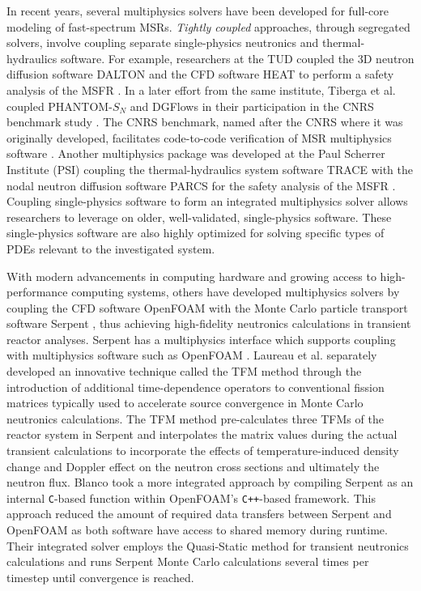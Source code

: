 In recent years, several multiphysics solvers have been developed for full-core
modeling of fast-spectrum \glspl{MSR}. \textit{Tightly coupled} approaches,
through segregated solvers, involve coupling separate single-physics neutronics
and thermal-hydraulics software. For example, researchers at
the \gls{TUD} coupled the 3D neutron diffusion software DALTON
\cite{boer_validation_2010} and the \gls{CFD} software HEAT
\cite{de_zwaan_static_2007} to perform a safety analysis of the \gls{MSFR}
\cite{fiorina_modelling_2014}. In a later effort from the same institute,
Tiberga et al. \cite{tiberga_discontinuous_2019} coupled PHANTOM-$S_N$ and
DGFlows in their participation in the CNRS benchmark study
\cite{tiberga_results_2020}. The CNRS benchmark, named after the \gls{CNRS}
where it was originally developed, facilitates code-to-code verification of
\gls{MSR} multiphysics software \cite{aufiero_testing_2018}. Another
multiphysics package was developed at the Paul Scherrer Institute (PSI)
coupling the thermal-hydraulics system software \gls{TRACE}
\cite{nrc_trace_2007} with the
nodal neutron diffusion software \gls{PARCS} \cite{downar_parcs_2010} for the
safety analysis of the \gls{MSFR} \cite{pettersen_coupled_2016}. Coupling
single-physics software to form an integrated multiphysics solver allows
researchers to leverage on older, well-validated, single-physics software.
These single-physics software are also highly optimized for solving specific
types of \glspl{PDE} relevant to the investigated system.

With modern advancements in computing hardware and growing access to
high-performance computing systems, others have developed multiphysics solvers
by coupling the \gls{CFD} software OpenFOAM
\cite{the_openfoam_foundation_ltd_openfoam_2021} with the Monte Carlo particle
transport software
Serpent \cite{leppanen_serpent_2014}, thus achieving high-fidelity neutronics
calculations in transient reactor analyses. Serpent has a multiphysics
interface which supports coupling with multiphysics software such as OpenFOAM
\cite{leppanen_development_2013}. Laureau et al. \cite{laureau_transient_2017}
separately developed an innovative technique called the
\gls{TFM} method through the introduction of additional time-dependence
operators to conventional fission matrices typically used to accelerate source
convergence in Monte Carlo neutronics calculations. The \gls{TFM} method
pre-calculates three \glspl{TFM} of the reactor system in Serpent and
interpolates the matrix values during the actual transient calculations to
incorporate the effects of temperature-induced density change and Doppler
effect on the neutron cross sections and ultimately the neutron flux. Blanco
\cite{blanco_neutronic_2020} took a more integrated approach by
compiling Serpent as an internal \texttt{C}-based function within OpenFOAM's
\texttt{C++}-based framework. This approach reduced the amount of required data
transfers between Serpent and OpenFOAM as both software have access to shared
memory during runtime. Their integrated solver employs the Quasi-Static
method for transient neutronics calculations and runs Serpent Monte Carlo
calculations several times per timestep until convergence is reached.

